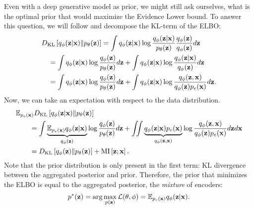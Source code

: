 Even with a deep generative model as prior, we might still ask ourselves, what is the optimal prior that would maximize the Evidence Lower bound. 
To answer this question, we will follow \citet{hoffman2016elbo} and decompose the KL-term of the ELBO:
\begin{align}
&D_{\mathrm{KL}}\left[q_{\phi}({\mathbf{z}}|{\mathbf{x}})\|p_{\theta}({\mathbf{z}})\right] = \int q_{\phi}({\mathbf{z}}|{\mathbf{x}}) \log \frac{q_{\phi}({\mathbf{z}}|{\mathbf{x}})}{p_{\theta}({\mathbf{z}})}\frac{q_{\phi}({\mathbf{z}})}{q_{\phi}({\mathbf{z}})}d{\mathbf{z}}\\
 &\quad=\int q_{\phi}({\mathbf{z}}|{\mathbf{x}}) \log \frac{q_{\phi}({\mathbf{z}})}{p_{\theta}({\mathbf{z}})}d{\mathbf{z}}  + \int  q_{\phi}({\mathbf{z}}|{\mathbf{x}}) \log \frac{q_{\phi}({\mathbf{z}}|{\mathbf{x}})}{q_{\phi}({\mathbf{z}})}d{\mathbf{z}}  \\
 &\quad=\int q_{\phi}({\mathbf{z}}|{\mathbf{x}}) \log \frac{q_{\phi}({\mathbf{z}})}{p_{\theta}({\mathbf{z}})}d{\mathbf{z}}  + \int  q_{\phi}({\mathbf{z}}|{\mathbf{x}}) \log \frac{q_{\phi}({\mathbf{z}}, {\mathbf{x}})}{q_{\phi}({\mathbf{z}}) p_e({\mathbf{x}})}d{\mathbf{z}}. 
\end{align}
Now, we can take an expectation with respect to the data distribution.
\begin{align}\label{eq:intro_kl_to_vamp}
&\E_{p_e(\rvx)} \KL{q_{\phi}(\rvz|\rvx)}{p_{\theta}(\rvz)}  \\
&\quad\quad=\int \underbrace{\E_{p_e(\rvx)} q_{\phi}(\rvz|\rvx)}_{q_{\phi}(\rvz)} \log \frac{q_{\phi}(\rvz)}{p_{\theta}(\rvz)}d\rvz  
+ \iint  \underbrace{q_{\phi}(\rvz|\rvx)p_e(\rvx)}_{q_{\phi}(\rvz, \rvx)} \log \frac{q_{\phi}(\rvz, \rvx)}{q_{\phi}(\rvz) p_e(\rvx)}d\rvz d\rvx \notag\\
&\quad\quad= \KL{q_{\phi}(\rvz)}{p_{\theta}(\rvz)}
+ \text{MI}\left[\rvz; \rvx\right].
\end{align}
Note that the prior distribution is only present in the first term: KL divergence between the aggregated posterior and prior. Therefore, the prior that minimizes the ELBO is equal to the aggregated posterior, the \textit{mixture} of encoders:
\begin{equation}
    p^*({\mathbf{z}}) = \arg\max_{p({\mathbf{z}})}\mathcal{L}(\theta, \phi) = \mathbb{E}_{p_e({\mathbf{x}})}q_{\phi}({\mathbf{z}}|{\mathbf{x}}).
\end{equation}
